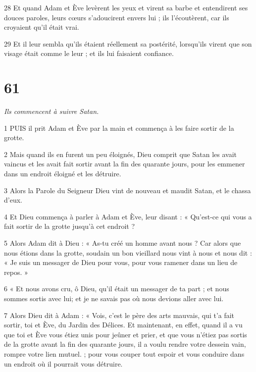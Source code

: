 \par 28 Et quand Adam et Ève levèrent les yeux et virent sa barbe et entendirent ses douces paroles, leurs cœurs s'adoucirent envers lui ; ils l'écoutèrent, car ils croyaient qu'il était vrai.

\par 29 Et il leur sembla qu'ils étaient réellement sa postérité, lorsqu'ils virent que son visage était comme le leur ; et ils lui faisaient confiance.

\chapter{61}

\par \textit{Ils commencent à suivre Satan.}

\par 1 PUIS il prit Adam et Ève par la main et commença à les faire sortir de la grotte.

\par 2 Mais quand ils en furent un peu éloignés, Dieu comprit que Satan les avait vaincus et les avait fait sortir avant la fin des quarante jours, pour les emmener dans un endroit éloigné et les détruire.

\par 3 Alors la Parole du Seigneur Dieu vint de nouveau et maudit Satan, et le chassa d'eux.

\par 4 Et Dieu commença à parler à Adam et Ève, leur disant : « Qu'est-ce qui vous a fait sortir de la grotte jusqu'à cet endroit ?

\par 5 Alors Adam dit à Dieu : « As-tu créé un homme avant nous ? Car alors que nous étions dans la grotte, soudain un bon vieillard nous vint à nous et nous dit : « Je suis un messager de Dieu pour vous, pour vous ramener dans un lieu de repos. »

\par 6 « Et nous avons cru, ô Dieu, qu'il était un messager de ta part ; et nous sommes sortis avec lui; et je ne savais pas où nous devions aller avec lui.

\par 7 Alors Dieu dit à Adam : « Vois, c'est le père des arts mauvais, qui t'a fait sortir, toi et Ève, du Jardin des Délices. Et maintenant, en effet, quand il a vu que toi et Ève vous étiez unis pour jeûner et prier, et que vous n'étiez pas sortis de la grotte avant la fin des quarante jours, il a voulu rendre votre dessein vain, rompre votre lien mutuel. ; pour vous couper tout espoir et vous conduire dans un endroit où il pourrait vous détruire.

